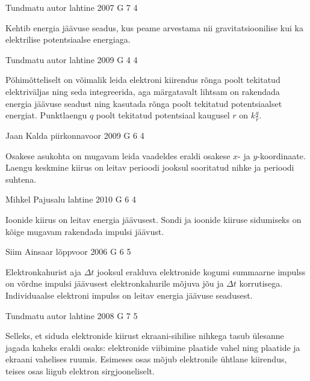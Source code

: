 \documentclass[11pt, twoside]{article}
\begin{document}
{%
{Tundmatu autor} %
{lahtine} %
{2007} %
{G 7} %
{4} %
{

\ifHint
Kehtib energia jäävuse seadus, kus peame arvestama nii gravitatsioonilise kui ka elektrilise potentsiaalse energiaga.
\fi
}

{Tundmatu autor} %
{lahtine} %
{2009} %
{G 4} %
{4} %
{

\ifHint
Põhimõtteliselt on võimalik leida elektroni kiirendus rõnga poolt tekitatud elektriväljas ning seda integreerida, aga märgatavalt lihtsam on rakendada energia jäävuse seadust ning kasutada rõnga poolt tekitatud potentsiaalset energiat. Punktlaengu $q$ poolt tekitatud potentsiaal kaugusel $r$ on $k\frac{q}{r}$.
\fi
}

{Jaan Kalda} %
{piirkonnavoor} %
{2009} %
{G 6} %
{4} %
{

\ifHint
Osakese asukohta on mugavam leida vaadeldes eraldi osakese $x$- ja $y$-koordinaate. Laengu keskmine kiirus on leitav perioodi jooksul sooritatud nihke ja perioodi suhtena.
\fi
}

{Mihkel Pajusalu} %
{lahtine} %
{2010} %
{G 6} %
{4} %
{

\ifHint
Ioonide kiirus on leitav energia jäävusest. Sondi ja ioonide kiiruse sidumiseks on kõige mugavam rakendada impulsi jäävust.
\fi
}

{Siim Ainsaar} %
{lõppvoor} %
{2006} %
{G 6} %
{5} %
{

\ifHint
Elektronkahurist aja $\Delta t$ jooksul eralduva elektronide kogumi summaarne impulss on võrdne impulsi jäävusest elektronkahurile mõjuva jõu ja $\Delta t$ korrutisega. Individuaalse elektroni impulss on leitav energia jäävuse seadusest.
\fi
}

{Tundmatu autor} %
{lahtine} %
{2008} %
{G 7} %
{5} %
{

\ifHint
Selleks, et siduda elektronide kiirust ekraani-sihilise nihkega tasub ülesanne jagada kaheks eraldi osaks: elektronide viibimine plaatide vahel ning plaatide ja ekraani vahelises ruumis. Esimeses osas mõjub elektronile ühtlane kiirendus, teises osas liigub elektron sirgjooneliselt.
\fi
}

}
\end{document}
